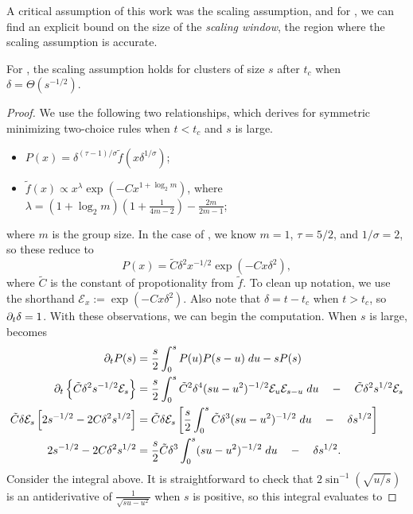 \documentclass[twoside,10pt]{article}
\begin{document}
A critical assumption of this work was the scaling assumption, and for \ER, we can find an explicit bound on the size of the \textit{scaling window}, the region where the scaling assumption is accurate.

\begin{thrm}[]
	\label{crit-window}
	For \ER, the scaling assumption holds for clusters of size $s$ after $t_{c}$ when $\delta = \Theta(s^{-1/2})$.
\end{thrm}
\begin{proof}
	We use the following two relationships, which \cite{daCosta} derives for symmetric minimizing two-choice rules when $t < t_c$ and $s$ is large.
\begin{itemize}
        \item $P(x) = \delta^{(\tau-1)/\sigma} \tilde{f}(x \delta^{1/\sigma})$;
        \item $\tilde{f}(x) \propto x^{\lambda} \exp\left( -Cx^{1 + \log_2 m} \right)$, where $\lambda = (1+\log_2 m)\left( 1 + \frac{1}{4m-2}  \right)-\frac{2m}{2m-1} $;
\end{itemize}
where $m$ is the group size. In the case of \ER, we know $m=1$, $\tau=5/2$, and $1/\sigma = 2$, so these reduce to
\[
        P(x) = \tilde{C} \delta^{2} x^{-1/2} \exp\left( -Cx \delta^{2} \right),
\]
where $ \tilde{C}$ is the constant of propotionality from $\tilde{f}$. To clean up notation, we use the shorthand $\mathcal{E}_x := \exp\left( -C x \delta^{2} \right)$. Also note that $\delta = t-t_c$ when $t > t_c$, so $\partial_{t}{\delta} =1$. With these observations, we can begin the computation. When $s$ is large,  becomes
\begin{align*}
        \partial_{t}{P}(s) &= \frac{s}{2} \int_{0}^{s} P(u)P(s-u)\;du - sP(s) \\
        \partial_{t}\left\{ \tilde{C} \delta^{2}s^{-1/2}\mathcal{E}_{s} \right\} &= \frac{s}{2} \int_{0}^{s} \tilde{C}^{2}\delta^{4}(su-u^2)^{-1/2} \mathcal{E}_{u}\mathcal{E}_{s-u} \; du \quad-\quad \tilde{C}\delta^{2}s^{1/2}\mathcal{E}_{s} \\
        \tilde{C} \delta \mathcal{E}_{s} \left[ 2s^{-1/2} - 2C\delta^{2}s^{1/2} \right] &= \tilde{C} \delta \mathcal{E}_{s} \left[ \frac{s}{2} \int_{0}^{s} \tilde{C}\delta^{3}(su-u^2)^{-1/2}  \; du \quad-\quad \delta s^{1/2} \right] \\
	2s^{-1/2} - 2C \delta^{2}s^{1/2} &= \frac{s}{2} \tilde{C} \delta^3 \int_{0}^{s} (su-u^2)^{-1/2}\;du \quad-\quad \delta s^{1/2}.
\end{align*}
	Consider the integral above. It is straightforward to check that $2\sin^{-1}(\sqrt{u/s} )$ is an antiderivative of $\frac{1}{\sqrt{su-u^2} } $ when $s$ is positive, so this integral evaluates to

\end{proof}
\end{document}
